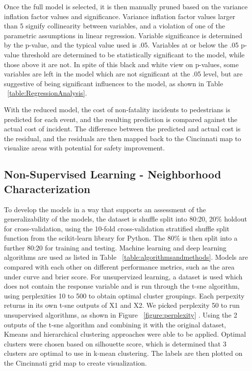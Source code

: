 \documentclass{llncs}
\begin{document}
Once the full model is selected, it is then manually pruned based on the variance inflation factor values and significance. Variance inflation factor values larger than 5 signify collinearity between variables, and a violation of one of the parametric assumptions in linear regression. Variable significance is determined by the p-value, and the typical value used is .05. Variables at or below the .05 p-value threshold are determined to be statistically significant to the model, while those above it are not. In spite of this black and white view on p-values, some variables are left in the model which are not significant at the .05 level, but are suggestive of being significant influences to the model, as shown in Table ~\ref{table:RegressionAnalysis}. 

With the reduced model, the cost of non-fatality incidents to pedestrians is predicted for each event, and the resulting prediction is compared against the actual cost of incident. The difference between the predicted and actual cost is the residual, and the residuals are then mapped back to the Cincinnati map to visualize areas with potential for safety improvement.

\subsection{Non-Supervised Learning - Neighborhood Characterization}

To develop the models in a way that supports an assessment of the generalizability of the models,  the dataset is shuffle split into 80:20, 20\% holdout for cross-validation, using the 10-fold cross-validation stratified shuffle split function from the scikit-learn library for Python. The 80\% is then split into a further 80:20 for training and testing. Machine learning and deep learning algorithms are used as listed in Table ~\ref{table:algorithmsandmethods}. Models are compared with each other on different performance metrics, such as the area under curve and brier score.
%
For unsupervized learning, a dataset is used which does not contain the response variable and is run through the t-sne algorithm, using perplexities 10 to 500 to obtain optimal cluster groupings. Each perpexity returns in its own t-sne outputs of X1 and X2. We picked perplexity 50 to run unsupervised algorithms, as shown in Figure ~\ref{figure:perplexity} . Using the 2 outputs of the t-sne algorithm and combining it with the original dataset, Kmeans and hierarchical clustering approaches were able to be applied.  Optimal clusters were chosen based on silhouette score, which is determined that 3 clusters are optimal to use in k-mean clustering.  The labels are then plotted on the Cincinnati grid map to create visualization. 
\end{document}
